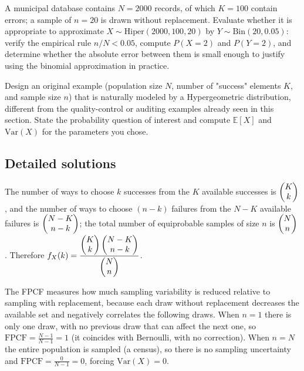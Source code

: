 \begin{problema}
	\label{prob:7cf587b}
	A municipal database contains $N=2000$ records, of which $K=100$ contain errors; a sample of $n=20$ is drawn without replacement. Evaluate whether it is appropriate to approximate $X\sim\text{Hiper}(2000,100,20)$ by $Y\sim\text{Bin}(20, 0.05)$: verify the empirical rule $n/N<0.05$, compute $P(X=2)$ and $P(Y=2)$, and determine whether the absolute error between them is small enough to justify using the binomial approximation in practice.
\end{problema}

\begin{problema}
	\label{prob:969b25a}
	Design an original example (population size $N$, number of "success" elements $K$, and sample size $n$) that is naturally modeled by a Hypergeometric distribution, different from the quality-control or auditing examples already seen in this section. State the probability question of interest and compute $\mathbb{E}[X]$ and $\text{Var}(X)$ for the parameters you chose.
\end{problema}

\subsection*{Detailed solutions}

\begin{solproblema}[prob:748a77d]
	The number of ways to choose $k$ successes from the $K$ available successes is $\begin{pmatrix} K \\ k\end{pmatrix}$, and the number of ways to choose $(n-k)$ failures from the $N-K$ available failures is $\begin{pmatrix} N-K \\ n-k\end{pmatrix}$; the total number of equiprobable samples of size $n$ is $\begin{pmatrix} N \\ n\end{pmatrix}$. Therefore $f_X(k) = \dfrac{\begin{pmatrix} K \\ k\end{pmatrix}\begin{pmatrix} N-K \\ n-k\end{pmatrix}}{\begin{pmatrix} N \\ n\end{pmatrix}}$.
\end{solproblema}

\begin{solproblema}[prob:5e6e8bf]
	The FPCF measures how much sampling variability is reduced relative to sampling with replacement, because each draw without replacement decreases the available set and negatively correlates the following draws. When $n=1$ there is only one draw, with no previous draw that can affect the next one, so $\text{FPCF}=\frac{N-1}{N-1}=1$ (it coincides with Bernoulli, with no correction). When $n=N$ the entire population is sampled (a census), so there is no sampling uncertainty and $\text{FPCF}=\frac{0}{N-1}=0$, forcing $\text{Var}(X)=0$.
\end{solproblema}

